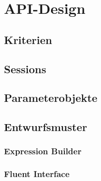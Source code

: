 \section{API-Design}
\label{sec:api-design}

\subsection{Kriterien}
\label{sec:design_criterias}

\subsection{Sessions}
\label{sec:sessions}

\subsection{Parameterobjekte}
\label{sec:parameter_objects}

\subsection{Entwurfsmuster}
\label{sec:patterns}

\subsubsection{Expression Builder}
\label{sec:expression_builder}

\subsubsection{Fluent Interface}
\label{sec:fluent_interface}
